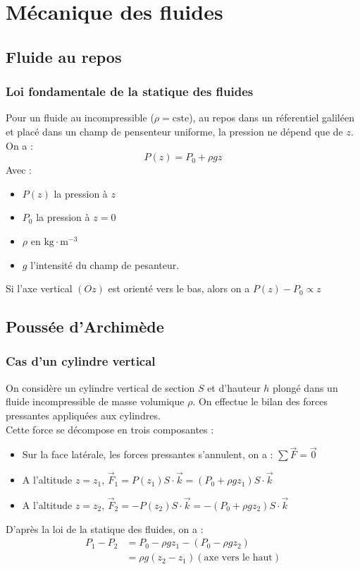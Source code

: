 \chapter{Mécanique des fluides}
\section{Fluide au repos}
\subsection{Loi fondamentale de la statique des fluides}

Pour un fluide au incompressible (\(\rho = \text{cste}\)), au repos dans un réferentiel galiléen et placé dans un champ de pensenteur uniforme, la pression ne dépend que de \(z\). On a : 
\[
    P(z) = P_{0}+\rho gz
\]
Avec :
\begin{itemize}
    \item \(P(z)\) la pression à \(z\)
    \item \(P_{0}\) la pression à \(z=0\) 
    \item \(\rho \) en \(\text{kg} \cdot \text{m}^{-3}\)
    \item \(g\) l'intensité du champ de pesanteur.   
\end{itemize}

\begin{remark}\label{}
    Si l'axe vertical \((Oz)\) est orienté vers le bas, alors on a \(P(z)-P_{0} \propto z\)  
\end{remark}

\section{Poussée d'Archimède}
\subsection{Cas d'un cylindre vertical}

On considère un cylindre vertical de section \(S\) et d'hauteur \(h\) plongé dans un fluide incompressible de masse volumique \(\rho \). On effectue le bilan des forces pressantes appliquées aux cylindres. \\
Cette force se décompose en trois composantes : 
\begin{itemize}
    \item Sur la face latérale, les forces pressantes s'annulent, on a : \(\sum \vec{F} = \vec{0}\)
    \item A l'altitude \(z = z_{1}\), \(\vec{F}_{1} = P(z_{1})S \cdot \vec{k} = (P_{0}+\rho g z_{1})S \cdot \vec{k}\)   
    \item A l'altitude \(z = z_{2}\), \(\vec{F}_{2} = -P(z_{2})S \cdot \vec{k} = -(P_{0}+\rho g z_{2})S \cdot \vec{k}\)
\end{itemize}
D'après la loi de la statique des fluides, on a : \\
\begin{eqnarray*}
    P_{1}-P_{2} &= P_{0} -\rho g z_{1} - (P_{0} - \rho g z_{2})\\
    &= \rho g(z_{2}-z_{1}) (\text{axe vers le haut})
\end{eqnarray*}

